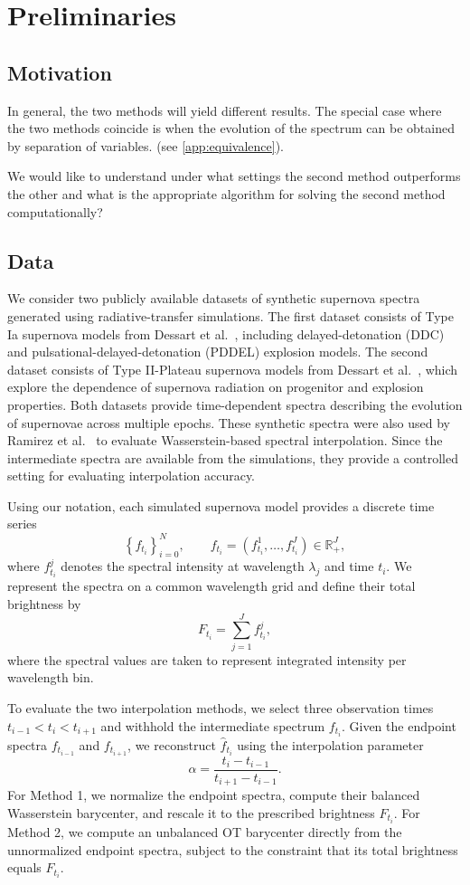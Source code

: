 \documentclass{article}
\begin{document}
\section{Preliminaries}
\subsection{Motivation}
In general, the two methods will yield different results. The special case where the two methods coincide is when the evolution of the spectrum can be obtained by separation of variables. (see \cref{app:equivalence}). 

We would like to understand under what settings the second method outperforms the other and what is the appropriate algorithm for solving the second method computationally?

\subsection{Data}

We consider two publicly available datasets of synthetic supernova spectra generated using radiative-transfer simulations. The first dataset consists of Type Ia supernova models from Dessart et al.~\cite{dessart2014}, including delayed-detonation (DDC) and pulsational-delayed-detonation (PDDEL) explosion models. The second dataset consists of Type II-Plateau supernova models from Dessart et al.~\cite{dessart2013}, which explore the dependence of supernova radiation on progenitor and explosion properties. Both datasets provide time-dependent spectra describing the evolution of supernovae across multiple epochs. These synthetic spectra were also used by Ramirez et al.~\cite{ramirez2024} to evaluate Wasserstein-based spectral interpolation. Since the intermediate spectra are available from the simulations, they provide a controlled setting for evaluating interpolation accuracy.

Using our notation, each simulated supernova model provides a discrete time series
\[
\left\{f_{t_i}\right\}_{i=0}^N,
\qquad
f_{t_i}=(f_{t_i}^1,\ldots,f_{t_i}^J)\in\mathbb R_+^J,
\]
where $f_{t_i}^j$ denotes the spectral intensity at wavelength $\lambda_j$ and time $t_i$. We represent the spectra on a common wavelength grid and define their total brightness by
\[
F_{t_i}=\sum_{j=1}^J f_{t_i}^j,
\]
where the spectral values are taken to represent integrated intensity per wavelength bin.

To evaluate the two interpolation methods, we select three observation times $t_{i-1}<t_i<t_{i+1}$ and withhold the intermediate spectrum $f_{t_i}$. Given the endpoint spectra $f_{t_{i-1}}$ and $f_{t_{i+1}}$, we reconstruct $\hat f_{t_i}$ using the interpolation parameter
\[
\alpha=\frac{t_i-t_{i-1}}{t_{i+1}-t_{i-1}}.
\]
For Method 1, we normalize the endpoint spectra, compute their balanced Wasserstein barycenter, and rescale it to the prescribed brightness $F_{t_i}$. For Method 2, we compute an unbalanced OT barycenter directly from the unnormalized endpoint spectra, subject to the constraint that its total brightness equals $F_{t_i}$.
\end{document}
